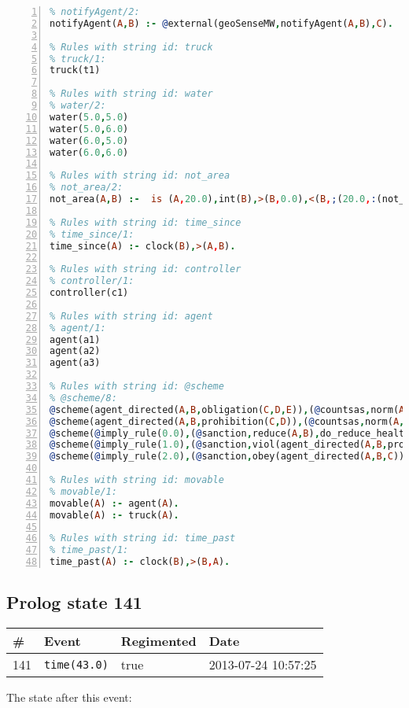\documentclass[11pt]{article}\usepackage[utf8]{inputenc}\usepackage{geometry}
\begin{document}
\begin{lstlisting}[language=Prolog, numbers=left]
% Rules with string id: notifyAgent
% notifyAgent/2:
notifyAgent(A,B) :- @external(geoSenseMW,notifyAgent(A,B),C).

% Rules with string id: truck
% truck/1:
truck(t1)

% Rules with string id: water
% water/2:
water(5.0,5.0)
water(5.0,6.0)
water(6.0,5.0)
water(6.0,6.0)

% Rules with string id: not_area
% not_area/2:
not_area(A,B) :-  is (A,20.0),int(B),>(B,0.0),<(B,;(20.0,:(not_area(A,B), is (-(B),20.0)))),int(A),>(A,0.0),<(A,;(20.0,:(area(A,B),-(int(A))))),int(B),>(A,0.0),>(B,0.0),<(A,21.0),<(B,21.0).

% Rules with string id: time_since
% time_since/1:
time_since(A) :- clock(B),>(A,B).

% Rules with string id: controller
% controller/1:
controller(c1)

% Rules with string id: agent
% agent/1:
agent(a1)
agent(a2)
agent(a3)

% Rules with string id: @scheme
% @scheme/8:
@scheme(agent_directed(A,B,obligation(C,D,E)),(@countsas,norm(A,B,F,obligation(C,D,E)),F),false,(listTrue(C)),(time_past(D)),false,[plus(viol(agent_directed(A,B,obligation(C,D,E))))|[]],[plus(obey(agent_directed(A,B,obligation(C,D,E))))|[]])
@scheme(agent_directed(A,B,prohibition(C,D)),(@countsas,norm(A,B,E,prohibition(C,D)),E),(listTrue(C)),false,(false),false,[plus(viol(agent_directed(A,B,prohibition(C,D))))|[]],[plus(obey(agent_directed(A,B,prohibition(C,D))))|[]])
@scheme(@imply_rule(0.0),(@sanction,reduce(A,B),do_reduce_health(A,B),notifyAgent(A,changed(status))),true,false,false,false,[min(reduce(A,B))|[]],[])
@scheme(@imply_rule(1.0),(@sanction,viol(agent_directed(A,B,prohibition(C,D))),do_sanction(D)),true,false,false,false,[min(viol(agent_directed(A,B,prohibition(C,D))))|[]],[])
@scheme(@imply_rule(2.0),(@sanction,obey(agent_directed(A,B,C))),true,false,false,false,[min(obey(agent_directed(A,B,C)))|[]],[])

% Rules with string id: movable
% movable/1:
movable(A) :- agent(A).
movable(A) :- truck(A).

% Rules with string id: time_past
% time_past/1:
time_past(A) :- clock(B),>(B,A).

\end{lstlisting}
\clearpage 
\subsection{Prolog state 141}
\begin{table}[ht]
\centering 
\begin{tabular}{l l l l} 
\textbf{\#} & \textbf{Event} & \textbf{Regimented} & \textbf{Date} \\ [0.5ex] 
\hline
141&\texttt{time(43.0)}&true&2013-07-24 10:57:25\\ [1ex] \hline\end{tabular}
\end{table}
The state after this event:
\end{document}
